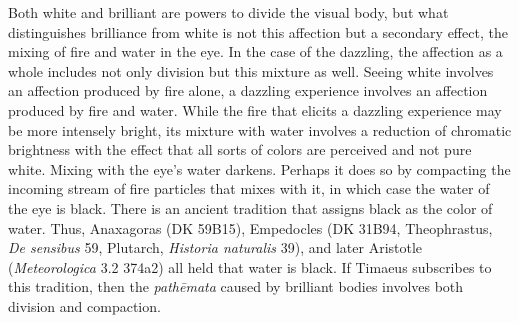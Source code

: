 Both white and brilliant are powers to divide the visual body, but what distinguishes brilliance from white is not this affection but a secondary effect, the mixing of fire and water in the eye. In the case of the dazzling, the affection as a whole includes not only division but this mixture as well. Seeing white involves an affection produced by fire alone, a dazzling experience involves an affection produced by fire and water. While the fire that elicits a dazzling experience may be more intensely bright, its mixture with water involves a reduction of chromatic brightness with the effect that all sorts of colors are perceived and not pure white. Mixing with the eye's water darkens. Perhaps it does so by compacting the incoming stream of fire particles that mixes with it, in which case the water of the eye is black. There is an ancient tradition that assigns black as the color of water. Thus, Anaxagoras (DK 59B15), Empedocles (DK 31B94, Theophrastus, \emph{De sensibus} 59, Plutarch, \emph{Historia naturalis} 39), and later Aristotle (\emph{Meteorologica} 3.2 374a2) all held that water is black. If Timaeus subscribes to this tradition, then the \emph{pathēmata} caused by brilliant bodies involves both division and compaction.


